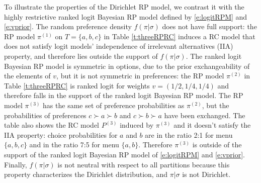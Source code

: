 \documentclass[11pt,letter]{article}
\newcommand{\Dpi}{Dirichlet RP model}
\begin{document}
To illustrate the properties of the \Dpi{}, we contrast it with the highly restrictive ranked logit Bayesian RP model defined by \eqref{e:logitRPM} and \eqref{e:vprior}.
The random preference density $f(\pi|\sigma)$ does not have full support: the RP model $\pi^{(1)}$ on $T=\{a,b,c\}$ in Table \ref{t:threeRPRC} induces a RC model that does not satisfy logit models' independence of irrelevant alternatives (IIA) property, and therefore lies outside the support of $f(\pi|\sigma)$.
The ranked logit Bayesian RP model is symmetric in options, due to the prior exchangeability of the elements of $v$, but it is not symmetric in preferences: the RP model $\pi^{(2)}$ in Table \ref{t:threeRPRC} is ranked logit for weights $v = (1/2, 1/4, 1/4)$ and therefore falls in the support of the ranked logit Bayesian RP model.
The RP model $\pi^{(3)}$ has the same set of preference probabilities as $\pi^{(2)}$, but the probabilities of preferences $c \succ a \succ b$ and $c \succ b \succ a$ have been exchanged.
The table also shows the RC model $P^{(3)}$ induced by $\pi^{(3)}$ and it doesn't satisfy the IIA property: choice probabilities for $a$ and $b$ are in the ratio 2:1 for menu $\{a,b,c\}$ and in the ratio 7:5 for menu $\{a,b\}$.
Therefore $\pi^{(3)}$ is outside of the support of the ranked logit Bayesian RP model of \eqref{e:logitRPM} and \eqref{e:vprior}.
Finally, $f(\pi|\sigma)$ is not neutral with respect to all partitions because this property characterizes the Dirichlet distribution, and $\pi|\sigma$ is not Dirichlet.
\end{document}
